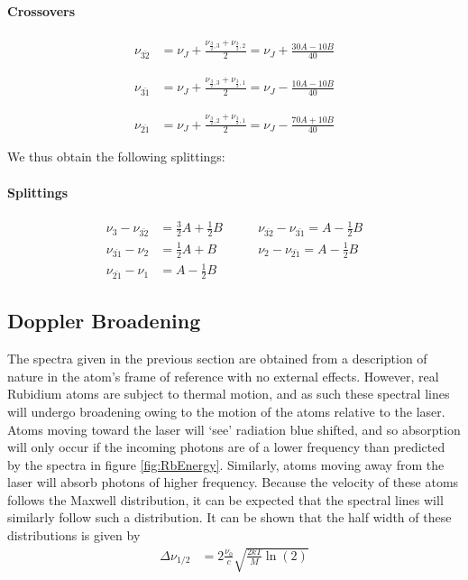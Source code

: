\documentclass[12pt]{article}
\begin{document}
\paragraph{Crossovers}
\begin{align*}
\nu_{\bar{32}} &= \nu_J + \frac{\nu_{\frac{3}{2},3} + \nu_{\frac{3}{2},2}}{2} = \nu_J + \frac{30A-10B}{40}
\end{align*}

\begin{align*}
\nu_{\bar{31}} &= \nu_J + \frac{\nu_{\frac{3}{2},3} + \nu_{\frac{3}{2},1}}{2} = \nu_J - \frac{10A-10B}{40}
\end{align*}

\begin{align*}
\nu_{\bar{21}} &= \nu_J + \frac{\nu_{\frac{3}{2},2} + \nu_{\frac{3}{2},1}}{2} = \nu_J - \frac{70A+10B}{40}
\end{align*}

We thus obtain the following splittings:
\paragraph{Splittings}
\begin{align}
\nu_{3}-\nu_{\bar{32}} &= \frac{3}{2}A+\frac{1}{2}B\qquad & \nu_{\bar{32}}-\nu_{\bar{31}}= A-\frac{1}{2}B\nonumber\\
\nu_{\bar{31}}-\nu_{2} &= \frac{1}{2}A+B\qquad & \nu_{2}-\nu_{\bar{21}}= A-\frac{1}{2}B \label{eq:87splittings}\\
\nu_{\bar{21}}-\nu_1 &= A-\frac{1}{2}B\nonumber
\end{align}

\subsection*{Doppler Broadening}

The spectra given in the previous section are obtained from a description of nature in the atom's frame of reference with no external effects.  However, real Rubidium atoms are subject to thermal motion, and as such these spectral lines will undergo broadening owing to the motion of the atoms relative to the laser.  Atoms moving toward the laser will `see' radiation blue shifted, and so absorption will only occur if the incoming photons are of a lower frequency than predicted by the spectra in figure \ref{fig:RbEnergy}.  Similarly, atoms moving away from the laser will absorb photons of higher frequency.  Because the velocity of these atoms follows the Maxwell distribution, it can be expected that the spectral lines will similarly follow such a distribution.  It can be shown that the half width of these distributions is given by 
\begin{align}
	\Delta \nu_{1/2} &= 2\frac{\nu_0}{c}\sqrt{\frac{2kT}{M}\ln(2)}
\end{align}
\end{document}
